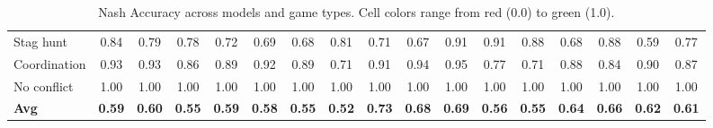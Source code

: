 \begin{table}[htbp]
\begin{adjustbox}{max width=\textwidth}
\begin{tabular}{lccccccccccccccc|c}
Stag hunt & \cellcolor[HTML]{63B973}0.84 & \cellcolor[HTML]{78C27D}0.79 & \cellcolor[HTML]{80C681}0.78 & \cellcolor[HTML]{9BD28E}0.72 & \cellcolor[HTML]{A7D794}0.69 & \cellcolor[HTML]{ACD996}0.68 & \cellcolor[HTML]{70BE79}0.81 & \cellcolor[HTML]{9ED390}0.71 & \cellcolor[HTML]{B2DC9A}0.67 & \cellcolor[HTML]{42AA63}0.91 & \cellcolor[HTML]{41A963}0.91 & \cellcolor[HTML]{4FAF69}0.88 & \cellcolor[HTML]{ABD996}0.68 & \cellcolor[HTML]{50B06A}0.88 & \cellcolor[HTML]{D4EBAA}0.59 & \cellcolor[HTML]{83C783}0.77 \\
Coordination & \cellcolor[HTML]{39A65F}0.93 & \cellcolor[HTML]{38A55E}0.93 & \cellcolor[HTML]{5BB56F}0.86 & \cellcolor[HTML]{4DAE68}0.89 & \cellcolor[HTML]{3CA760}0.92 & \cellcolor[HTML]{4DAF68}0.89 & \cellcolor[HTML]{A0D491}0.71 & \cellcolor[HTML]{43AA64}0.91 & \cellcolor[HTML]{37A55E}0.94 & \cellcolor[HTML]{30A25A}0.95 & \cellcolor[HTML]{82C682}0.77 & \cellcolor[HTML]{9FD390}0.71 & \cellcolor[HTML]{50B06A}0.88 & \cellcolor[HTML]{64B974}0.84 & \cellcolor[HTML]{49AD67}0.90 & \cellcolor[HTML]{56B36D}0.87 \\
No conflict & \cellcolor[HTML]{1A9850}1.00 & \cellcolor[HTML]{1A9850}1.00 & \cellcolor[HTML]{1A9850}1.00 & \cellcolor[HTML]{1A9850}1.00 & \cellcolor[HTML]{1A9850}1.00 & \cellcolor[HTML]{1A9850}1.00 & \cellcolor[HTML]{1A9850}1.00 & \cellcolor[HTML]{1A9850}1.00 & \cellcolor[HTML]{1A9850}1.00 & \cellcolor[HTML]{1A9850}1.00 & \cellcolor[HTML]{1A9850}1.00 & \cellcolor[HTML]{1A9850}1.00 & \cellcolor[HTML]{1A9850}1.00 & \cellcolor[HTML]{1A9850}1.00 & \cellcolor[HTML]{1A9850}1.00 & \cellcolor[HTML]{1A9850}1.00 \\
\midrule
\textbf{Avg} & \cellcolor[HTML]{D7EDAB}\textbf{0.59} & \cellcolor[HTML]{D2EBA9}\textbf{0.60} & \cellcolor[HTML]{EAF5B4}\textbf{0.55} & \cellcolor[HTML]{D6ECAB}\textbf{0.59} & \cellcolor[HTML]{D9EEAC}\textbf{0.58} & \cellcolor[HTML]{E8F4B3}\textbf{0.55} & \cellcolor[HTML]{F5FABA}\textbf{0.52} & \cellcolor[HTML]{93CE8B}\textbf{0.73} & \cellcolor[HTML]{ACDA97}\textbf{0.68} & \cellcolor[HTML]{A6D794}\textbf{0.69} & \cellcolor[HTML]{E2F2B1}\textbf{0.56} & \cellcolor[HTML]{EAF5B4}\textbf{0.55} & \cellcolor[HTML]{BDE19F}\textbf{0.64} & \cellcolor[HTML]{B7DE9C}\textbf{0.66} & \cellcolor[HTML]{C8E6A4}\textbf{0.62} & \cellcolor[HTML]{CEE9A7}\textbf{0.61} \\
\bottomrule
\end{tabular}
\end{adjustbox}
\caption{Nash Accuracy across models and game types. 
Cell colors range from \textcolor[HTML]{D73027}{red} (0.0) to \textcolor[HTML]{1A9850}{green} (1.0).}
\label{tab:accuracy_heatmap}
\end{table}